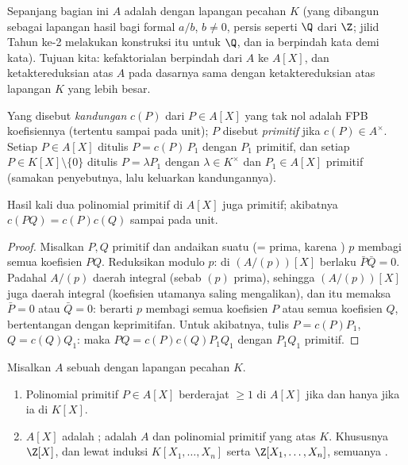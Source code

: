 Sepanjang bagian ini $A$ adalah  dengan lapangan pecahan $K$
(yang dibangun sebagai lapangan hasil bagi formal $a/b$, $b \neq 0$,
persis seperti $\Q$ dari $\Z$; jilid Tahun ke-2 melakukan
konstruksi itu untuk $\Q$, dan ia berpindah kata demi kata). Tujuan kita:
kefaktorialan berpindah dari $A$ ke $A[X]$, dan ketaktereduksian atas
$A$ pada dasarnya sama dengan ketaktereduksian atas lapangan $K$ yang lebih besar.

\begin{definition}\label{def:b3:rings:content}
Yang disebut \emph{kandungan} $c(P)$ dari
$P \in A[X]$ yang tak nol adalah FPB koefisiennya (tertentu sampai pada
unit); $P$ disebut \emph{primitif} jika $c(P) \in A^\times$. Setiap $P
\in A[X]$ ditulis $P = c(P)\,P_1$ dengan $P_1$ primitif, dan setiap
$P \in K[X]\setminus\{0\}$ ditulis $P = \lambda P_1$ dengan $\lambda
\in K^\times$ dan $P_1 \in A[X]$ primitif (samakan penyebutnya,
lalu keluarkan kandungannya).
\end{definition}

\begin{lemma}[Gauss]\label{lem:b3:rings:gauss}
Hasil kali dua polinomial primitif di $A[X]$ juga primitif;
akibatnya $c(PQ) = c(P)c(Q)$ sampai pada unit.
\end{lemma}

\begin{proof}
Misalkan $P, Q$ primitif dan andaikan suatu  (= prima, karena
) $p$ membagi semua koefisien $PQ$. Reduksikan modulo $p$: di
$(A/(p))[X]$ berlaku $\bar P \bar Q = 0$. Padahal $A/(p)$ daerah integral
(sebab $(p)$ prima), sehingga $(A/(p))[X]$ juga daerah integral (koefisien utamanya
saling mengalikan), dan itu memaksa $\bar P = 0$ atau $\bar Q = 0$: berarti $p$ membagi semua
koefisien $P$ atau semua koefisien $Q$, bertentangan dengan keprimitifan. Untuk
akibatnya, tulis $P = c(P)P_1$, $Q = c(Q)Q_1$: maka $PQ =
c(P)c(Q) P_1Q_1$ dengan $P_1Q_1$ primitif.
\end{proof}

\begin{theorem}\label{thm:b3:rings:gaussufd}
Misalkan $A$ sebuah  dengan lapangan pecahan $K$.
\begin{enumerate}
  \item Polinomial primitif $P \in A[X]$ berderajat $\geq 1$ 
        di $A[X]$ jika dan hanya jika ia  di $K[X]$.
  \item $A[X]$ adalah ;  adalah 
        $A$ dan polinomial primitif yang  atas $K$.
        Khususnya $\Z[X]$, dan lewat induksi $K[X_1, \dots, X_n]$
        serta $\Z[X_1, \dots, X_n]$, semuanya .
\end{enumerate}
\end{theorem}

